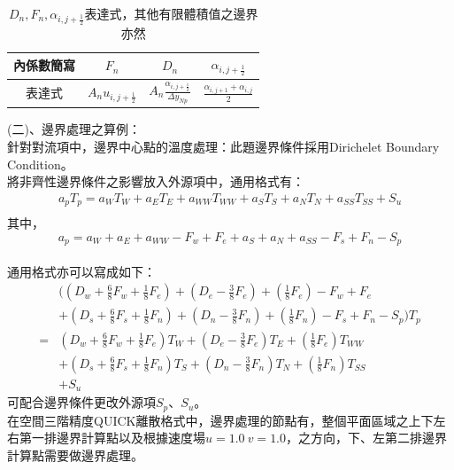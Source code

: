\documentclass[12pt]{article}
\begin{document}
\begin{table}[H]
    \centering
    \begin{tabular}{|c|c|c|c|}
        \hline
        內係數簡寫&$F_{n}$&$D_{n}$& $\alpha_{i,j+\frac{1}{2}}$ \\ 
        \hline
        表達式&$A_{n}u_{i,j+\frac{1}{2}}$&$A_{n}\frac{\alpha_{i,j+\frac{1}{2}}}{\Delta y_{Np}}$& $\frac{\alpha_{i,j+1}+\alpha_{i,j}}{2}$ \\
        \hline
    \end{tabular}
    \caption{$D_{n},F_{n},\alpha_{i,j+\frac{1}{2}}$表達式，其他有限體積值之邊界亦然}
    \label{tab:3D_e_F_e_alpha}
\end{table}
\newpage
\noindent (二)、邊界處理之算例：\\
\noindent 針對對流項中，邊界中心點的溫度處理：此題邊界條件採用Dirichelet Boundary Condition。\\
\noindent 將非齊性邊界條件之影響放入外源項中，通用格式有：
\begin{equation}
  \begin{split}
    a_{p}T_{p} = a_{W}T_{W}+a_{E}T_{E}+a_{WW}T_{WW}+a_{S}T_{S}+a_{N}T_{N}+a_{SS}T_{SS} + S_{u}\\
  \end{split}
\end{equation}
\noindent 其中，$$a_{p} = a_{W}+a_{E}+a_{WW}-F_{w}+F_{e}+a_{S}+a_{N}+a_{SS}-F_{s}+F_{n}-S_{p}$$\\
\noindent 通用格式亦可以寫成如下：
\begin{equation}
  \begin{split}
    &((D_{w}+\frac{6}{8}F_{w}+\frac{1}{8}F_{e})+(D_{e}-\frac{3}{8}F_{e})+(\frac{1}{8}F_{e})-F_{w}+F_{e}\\
    &+(D_{s}+\frac{6}{8}F_{s}+\frac{1}{8}F_{n})+(D_{n}-\frac{3}{8}F_{n})+(\frac{1}{8}F_{n})-F_{s}+F_{n}-S_{p})T_{p}\\
    =&(D_{w}+\frac{6}{8}F_{w}+\frac{1}{8}F_{e})T_{W}+(D_{e}-\frac{3}{8}F_{e})T_{E}+(\frac{1}{8}F_{e})T_{WW}\\
    &+(D_{s}+\frac{6}{8}F_{s}+\frac{1}{8}F_{n})T_{S}+(D_{n}-\frac{3}{8}F_{n})T_{N}+(\frac{1}{8}F_{n})T_{SS} \\
    &+S_{u}
  \end{split}
\end{equation}
\noindent 可配合邊界條件更改外源項$S_{p}$、$S_{u}$。\\
在空間三階精度QUICK離散格式中，邊界處理的節點有，整個平面區域之上下左右第一排邊界計算點以及根據速度場$u = 1.0 \  v = 1.0$，之方向，下、左第二排邊界計算點需要做邊界處理。
\end{document}
